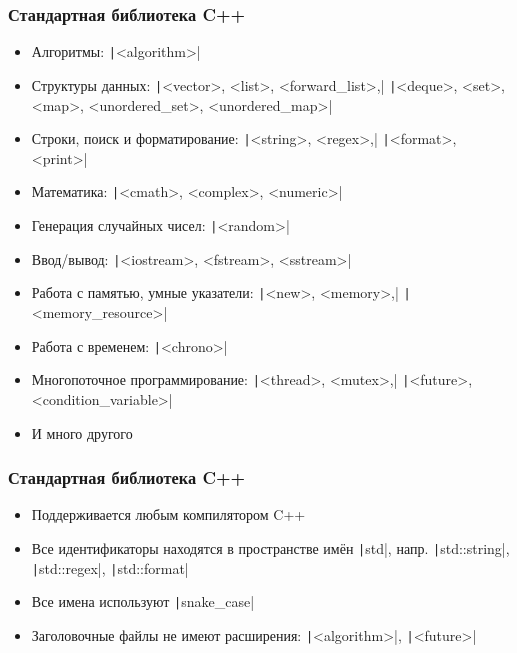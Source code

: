 \documentclass[10pt]{beamer}
\begin{document}
\begin{frame}[fragile]
\frametitle{Стандартная библиотека C++}
\begin{itemize}
\item Алгоритмы: \texttt|<algorithm>|
\item Структуры данных: \texttt|<vector>, <list>, <forward_list>,| \texttt|<deque>, <set>, <map>, <unordered_set>, <unordered_map>|
\item Строки, поиск и форматирование: \texttt|<string>, <regex>,| \texttt|<format>, <print>|
\item Математика: \texttt|<cmath>, <complex>, <numeric>|
\item Генерация случайных чисел: \texttt|<random>|
\item Ввод/вывод: \texttt|<iostream>, <fstream>, <sstream>|
\item Работа с памятью, умные указатели: \texttt|<new>, <memory>,| \texttt|<memory_resource>|
\item Работа с временем: \texttt|<chrono>|
\item Многопоточное программирование: \texttt|<thread>, <mutex>,| \texttt|<future>, <condition_variable>|
\item И много другого
\end{itemize}
\end{frame}

\begin{frame}[fragile]
\frametitle{Стандартная библиотека C++}
\begin{itemize}
\item Поддерживается любым компилятором C++
\pause
\item Все идентификаторы находятся в пространстве имён \texttt|std|, напр. \texttt|std::string|, \texttt|std::regex|, \texttt|std::format|
\pause
\item Все имена используют \texttt|snake_case|
\pause
\item Заголовочные файлы не имеют расширения: \texttt|<algorithm>|, \texttt|<future>|
\end{itemize}
\end{frame}
\end{document}
